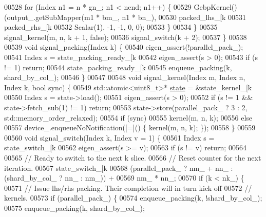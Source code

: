 \begin{DoxyCode}
00528           \textcolor{keywordflow}{for} (Index n1 = n * gn\_; n1 < nend; n1++) \{
00529             GebpKernel()(output\_.getSubMapper(m1 * bm\_, n1 * bn\_),
00530                          packed\_lhs\_[k %
00531                          packed\_rhs\_[k %
00532                          Scalar(1), -1, -1, 0, 0);
00533           \}
00534       \}
00535       signal\_kernel(m, n, k + 1, \textcolor{keyword}{false});
00536       signal\_switch(k + 2);
00537     \}
00538 
00539     \textcolor{keywordtype}{void} signal\_packing(Index k) \{
00540       eigen\_assert(!parallel\_pack\_);
00541       Index s = state\_packing\_ready\_[k %
00542       eigen\_assert(s > 0);
00543       \textcolor{keywordflow}{if} (s != 1) \textcolor{keywordflow}{return};
00544       state\_packing\_ready\_[k %
00545       enqueue\_packing(k, shard\_by\_col\_);
00546     \}
00547 
00548     \textcolor{keywordtype}{void} signal\_kernel(Index m, Index n, Index k, \textcolor{keywordtype}{bool} sync) \{
00549       std::atomic<uint8\_t>* \hyperlink{structstate}{state} = &state\_kernel\_[k %
00550       Index s = state->load();
00551       eigen\_assert(s > 0);
00552       \textcolor{keywordflow}{if} (s != 1 && state->fetch\_sub(1) != 1) \textcolor{keywordflow}{return};
00553       state->store(parallel\_pack\_ ? 3 : 2, std::memory\_order\_relaxed);
00554       \textcolor{keywordflow}{if} (sync)
00555         kernel(m, n, k);
00556       \textcolor{keywordflow}{else}
00557         device\_.enqueueNoNotification([=]() \{ kernel(m, n, k); \});
00558     \}
00559 
00560     \textcolor{keywordtype}{void} signal\_switch(Index k, Index v = 1) \{
00561       Index s = state\_switch\_[k %
00562       eigen\_assert(s >= v);
00563       \textcolor{keywordflow}{if} (s != v) \textcolor{keywordflow}{return};
00564 
00565       \textcolor{comment}{// Ready to switch to the next k slice.}
00566       \textcolor{comment}{// Reset counter for the next iteration.}
00567       state\_switch\_[k %
00568           (parallel\_pack\_ ? nm\_ + nn\_ : (shard\_by\_col\_ ? nn\_ : nm\_)) +
00569           nm\_ * nn\_;
00570       \textcolor{keywordflow}{if} (k < nk\_) \{
00571         \textcolor{comment}{// Issue lhs/rhs packing. Their completion will in turn kick off}
00572         \textcolor{comment}{// kernels.}
00573         \textcolor{keywordflow}{if} (parallel\_pack\_) \{
00574           enqueue\_packing(k, !shard\_by\_col\_);
00575           enqueue\_packing(k, shard\_by\_col\_);

\end{DoxyCode}
